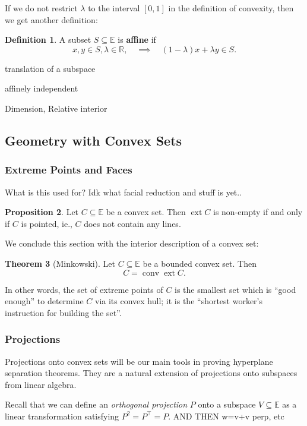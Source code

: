 \documentclass[11pt]{article}
\numberwithin{equation}{section}
\theoremstyle{definition}
\newtheorem{theorem}{Theorem}[section]
\newtheorem{proposition}[theorem]{Proposition}
\newtheorem{definition}[theorem]{Definition}%
\newcommand{\bE}{\mathbb{E}}
\newcommand{\bR}{\mathbb{R}}
\newcommand{\conv}{\operatorname{conv}}
\newcommand{\ext}{\operatorname{ext}}
\begin{document}
If we do not restrict $\lambda$ to the interval $[0,1]$ in the definition of convexity, then we get another definition:
\begin{definition}
    \label{defaffine}%
    A subset $S\subseteq\bE$ is \textbf{affine} if
    \begin{equation} \label{defaffineeq}%
    x, y\in S, \lambda\in\bR,\quad\implies\quad (1-\lambda)x+\lambda y\in S.\end{equation}
\end{definition}

translation of a subspace

affinely independent

Dimension, Relative interior
\subsection{Geometry with Convex Sets}
\subsubsection{Extreme Points and Faces}
What is this used for? Idk what facial reduction and stuff is yet..
\begin{proposition}
    Let $C\subseteq\bE$ be a convex set. Then $\ext C$ is non-empty if and only if $C$ is pointed, ie., $C$ does not contain any lines.
\end{proposition}

We conclude this section with the interior description of a convex set:
\begin{theorem}[Minkowski]
    Let $C\subseteq\bE$ be a bounded convex set. Then
    \begin{equation}
        C = \conv\ext C.
    \end{equation}
\end{theorem}
In other words, the set of extreme points of $C$ is the smallest set which is ``good enough'' to determine $C$ via its convex hull; it is the ``shortest worker's instruction for building the set''. 
\subsubsection{Projections}
Projections onto convex sets will be our main tools in proving hyperplane separation theorems. They are a natural extension of projections onto subspaces from linear algebra.

Recall that we can define an \textit{orthogonal projection} $P$ onto a subspace $V\subseteq\bE$ as a linear transformation satisfying $P^2=P^\top=P$. AND THEN w=v+v perp, etc
\end{document}
